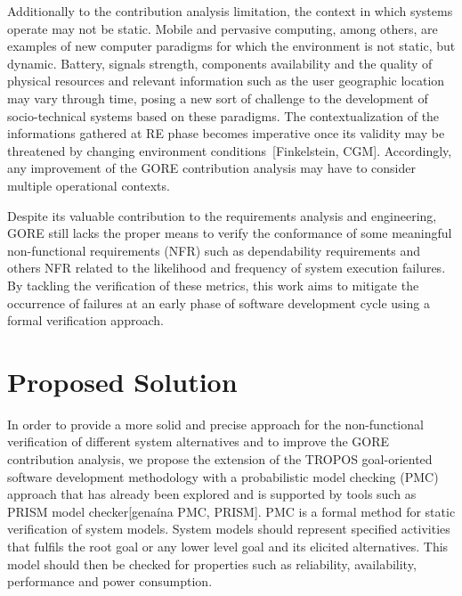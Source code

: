 Additionally to the contribution analysis limitation, the context in which systems operate may not be static. Mobile and pervasive computing, among others, are examples of new computer paradigms for which the environment is not static, but dynamic. Battery, signals strength, components availability and the quality of physical resources and relevant information such as the user geographic location may vary through time, posing a new sort of challenge to the development of socio-technical systems based on these paradigms. The contextualization of the informations gathered at RE phase becomes imperative once its validity may be threatened by changing environment conditions~[Finkelstein, CGM]. Accordingly, any improvement of the GORE contribution analysis may have to consider multiple operational contexts.

Despite its valuable contribution to the requirements analysis and engineering, GORE still lacks the proper means to verify the conformance of some meaningful non-functional requirements (NFR) such as dependability requirements and others NFR related to the likelihood and frequency of system execution failures. By tackling the verification of these metrics, this work aims to mitigate the occurrence of failures at an early phase of software development cycle using a formal verification approach.



\section{Proposed Solution}

In order to provide a more solid and precise approach for the non-functional verification of different system alternatives and to improve the GORE contribution analysis, we propose the extension of the TROPOS goal-oriented software development methodology with a probabilistic model checking (PMC) approach that has already been explored and is supported by tools such as PRISM model checker[genaína PMC, PRISM]. PMC is a formal method for static verification of system models. System models should represent specified activities that fulfils the root goal or any lower level goal and its elicited alternatives. This model should then be checked for properties such as reliability, availability, performance and power consumption.

